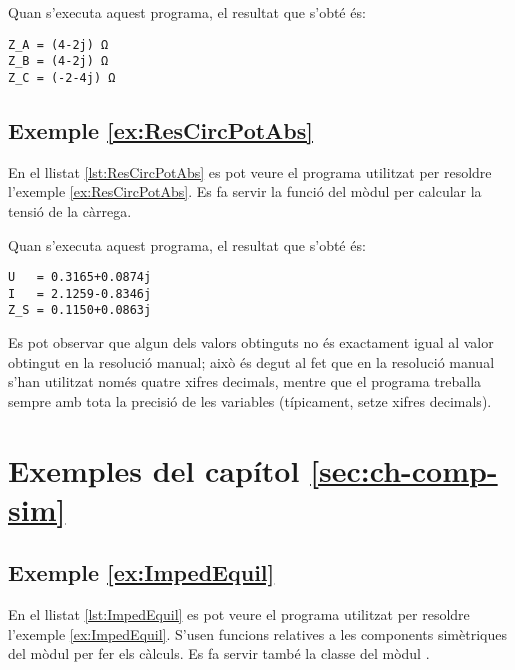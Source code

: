 Quan s'executa aquest programa, el resultat que s'obté és:
\lstset{
	language=,
	numbers=none,
	frame=none
}
\begin{lstlisting}
Z_A = (4-2j) Ω
Z_B = (4-2j) Ω
Z_C = (-2-4j) Ω
\end{lstlisting}


\hypertarget{exemple:ResCircPotAbs}{\subsection{Exemple \ref*{ex:ResCircPotAbs} \ResCircPotAbs}}
En el llistat \vref{lst:ResCircPotAbs} es pot veure el programa utilitzat per resoldre l'exemple \vref{ex:ResCircPotAbs}. Es fa servir la funció  del mòdul  per calcular la tensió de la càrrega.


Quan s'executa aquest programa, el resultat que s'obté és:
\lstset{
	language=,
	numbers=none,
	frame=none
}
\begin{lstlisting}
U   = 0.3165+0.0874j
I   = 2.1259-0.8346j
Z_S = 0.1150+0.0863j
\end{lstlisting}

Es pot observar que algun dels valors obtinguts no és exactament igual al valor obtingut en la resolució manual; això és degut al fet que en la resolució manual s'han utilitzat només quatre xifres decimals, mentre que el programa treballa sempre amb tota la precisió de les variables (típicament, setze xifres decimals).



\section{Exemples del capítol \ref*{sec:ch-comp-sim}}

\hypertarget{exemple:ImpedEquil}{\subsection{Exemple \ref*{ex:ImpedEquil} \ImpedEquil}}
En el llistat \vref{lst:ImpedEquil} es pot veure el programa utilitzat per resoldre l'exemple \vref{ex:ImpedEquil}. S'usen funcions relatives a les components simètriques del mòdul  per fer els càlculs. Es fa servir també la classe  del mòdul .


